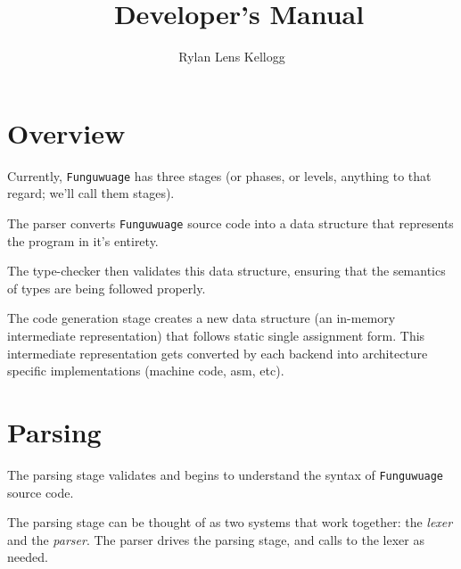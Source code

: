 \documentclass[12pt]{report}
\title  {\langname\ Developer's Manual}
\author {Rylan Lens Kellogg}
\newcommand{\langname}{Funguwuage}
\newcommand{\lang}{\texttt{\langname} }
\begin{document}
\pagestyle{fancy}
\renewcommand{\chaptermark}[1]{\markboth{#1}{#1}}
\fancyhf{}
\fancyhead[C]{\leftmark}
\fancyfoot[C]{\thepage}

\hypersetup{pageanchor=false}
\begin{titlepage}
  \maketitle
\end{titlepage}

\tableofcontents

\chapter{Overview}
\label{ch:Overview}

Currently, \lang has three stages (or phases, or levels, anything to that regard; we'll call them stages).

\begin{center}
\end{center}

The parser converts \lang source code into a data structure that represents the program in it's entirety.

The type-checker then validates this data structure, ensuring that the semantics of types are being followed properly.

The code generation stage creates a new data structure (an in-memory intermediate representation) that follows static single assignment form.
This intermediate representation gets converted by each backend into
architecture specific implementations (machine code, asm, etc).

\chapter{Parsing}
\label{ch:parsing}

The parsing stage validates and begins to understand the syntax of \lang source code.

The parsing stage can be thought of as two systems that work together: the \emph{lexer} and the \emph{parser}. The parser drives the parsing stage, and calls to the lexer as needed.
\end{document}

